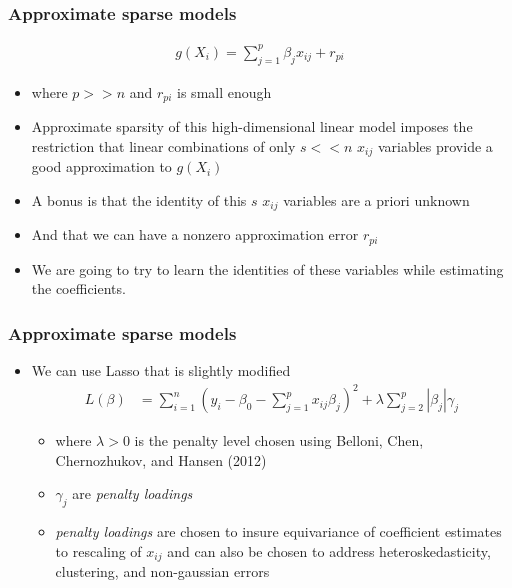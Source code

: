 \documentclass[
  shownotes,
  xcolor={svgnames},
  hyperref={colorlinks,citecolor=DarkBlue,linkcolor=DarkRed,urlcolor=DarkBlue}
  , aspectratio=169]{beamer}
\begin{document}
\begin{frame}[fragile]
\frametitle{Approximate sparse models}
\begin{align}
    g(X_i)=\sum_{j=1}^p \beta_j x_{ij} +r_{pi}
    \end{align}

\begin{itemize}
    \item where $p>>n$ and $r_{pi}$ is small enough 
    \medskip
    \item Approximate sparsity of this high-dimensional linear model imposes the restriction that linear combinations of only $s<<n$ $x_{ij}$ variables provide a good approximation to $g(X_i)$
    \medskip
    \item A bonus is that the identity of this $s$ $x_{ij}$ variables are a priori unknown
    \medskip
    \item And that we can have a nonzero approximation error $r_{pi}$
    \medskip
    \item We are going to try to learn the identities of these variables while estimating the coefficients.

\end{itemize}

\end{frame}
\begin{frame}[fragile]
\frametitle{Approximate sparse models}
\begin{itemize}

\item We can use Lasso that is slightly modified
\begin{align}
L(\beta) &= \sum_{i=1}^n (y_i-\beta_0 - \sum_{j=1}^p x_{ij}\beta_j)^2 + \lambda \sum_{j=2}^p |\beta_j| \gamma_j
\end{align}

\begin{itemize}
  \item where $\lambda>0$ is the penalty level chosen using  Belloni, Chen, Chernozhukov, and Hansen (2012)
  \medskip
  \item $\gamma_j$ are {\it penalty loadings}
  \medskip
  \item  {\it penalty loadings} are chosen to insure equivariance of coefficient estimates to rescaling of $x_{ij}$ and can also be chosen to address heteroskedasticity, clustering, and non-gaussian errors

\end{itemize}
\end{itemize}

\end{frame}
\end{document}
